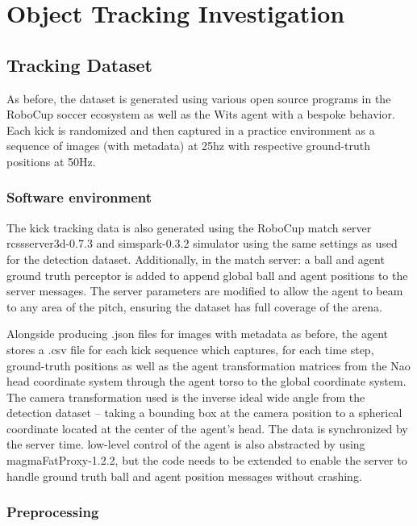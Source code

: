 \documentclass[a4paper,twoside,12pt]{report}
\begin{document}
\chapter{Object Tracking Investigation}

\section{Tracking Dataset}
As before, the dataset is generated using various open source programs in the RoboCup soccer ecosystem as well as the Wits agent with a bespoke behavior. Each kick is randomized and then captured in a practice environment as a sequence of images (with metadata) at 25hz with respective ground-truth positions at 50Hz.

\subsection{Software environment}
The kick tracking data is also generated using the RoboCup match server rcssserver3d-0.7.3 and simspark-0.3.2 simulator using the same settings as used for the detection dataset. Additionally, in the match server: a ball and agent ground truth perceptor is added to append global ball and agent positions to the server messages. The server parameters are modified to allow the agent to beam to any area of the pitch, ensuring the dataset has full coverage of the arena.

Alongside producing .json files for images with metadata as before, the agent stores a .csv file for each kick sequence which captures, for each time step, ground-truth positions as well as the agent transformation matrices from the Nao head coordinate system through the agent torso to the global coordinate system. The camera transformation used is the inverse ideal wide angle from the detection dataset -- taking a bounding box at the camera position to a spherical coordinate located at the center of the agent's head. The data is synchronized by the server time. low-level control of the agent is also abstracted by using magmaFatProxy-1.2.2, but the code needs to be extended to enable the server to handle ground truth ball and agent position messages without crashing. 

\subsection{Preprocessing}
\end{document}
